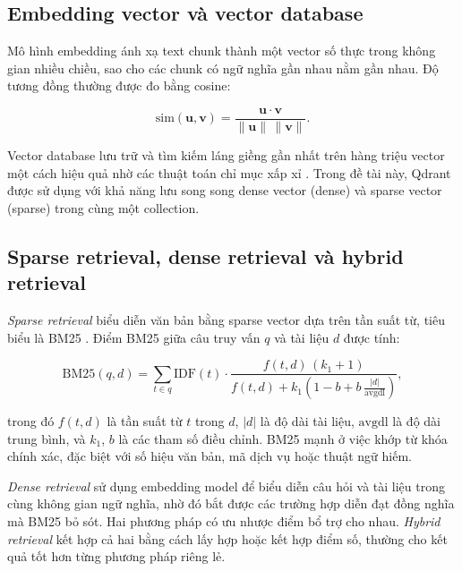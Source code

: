 \subsection{Embedding vector và vector database}

Mô hình embedding ánh xạ text chunk thành một vector số thực trong không gian
nhiều chiều, sao cho các chunk có ngữ nghĩa gần nhau nằm gần nhau. Độ tương đồng thường được
đo bằng cosine:

\begin{equation}
\mathrm{sim}(\mathbf{u}, \mathbf{v}) = \frac{\mathbf{u}\cdot\mathbf{v}}{\lVert\mathbf{u}\rVert\,\lVert\mathbf{v}\rVert}.
\end{equation}

Vector database lưu trữ và tìm kiếm láng giềng gần nhất trên hàng
triệu vector một cách hiệu quả nhờ các thuật toán chỉ mục xấp xỉ \cite{malkov2020hnsw}.
Trong đề tài này, Qdrant \cite{qdrant2024} được sử dụng với khả năng lưu song
song dense vector (dense) và sparse vector (sparse) trong cùng một collection.

\subsection{Sparse retrieval, dense retrieval và hybrid retrieval}

\emph{Sparse retrieval} biểu diễn văn bản bằng sparse vector dựa trên tần
suất từ, tiêu biểu là BM25 \cite{robertson2009bm25}. Điểm BM25 giữa câu truy vấn $q$ và
tài liệu $d$ được tính:

\begin{equation}
\mathrm{BM25}(q,d) = \sum_{t \in q} \mathrm{IDF}(t)\cdot
\frac{f(t,d)\,(k_1+1)}{f(t,d) + k_1\left(1-b+b\,\frac{|d|}{\mathrm{avgdl}}\right)},
\end{equation}

trong đó $f(t,d)$ là tần suất từ $t$ trong $d$, $|d|$ là độ dài tài liệu, $\mathrm{avgdl}$
là độ dài trung bình, và $k_1$, $b$ là các tham số điều chỉnh. BM25 mạnh ở việc khớp từ
khóa chính xác, đặc biệt với số hiệu văn bản, mã dịch vụ hoặc thuật ngữ hiếm.

\emph{Dense retrieval} \cite{karpukhin2020dpr} sử dụng embedding model để
biểu diễn câu hỏi và tài liệu trong cùng không gian ngữ nghĩa, nhờ đó bắt được các trường
hợp diễn đạt đồng nghĩa mà BM25 bỏ sót. Hai phương pháp có ưu nhược điểm bổ trợ cho nhau.
\emph{Hybrid retrieval} kết hợp cả hai bằng cách lấy hợp hoặc kết hợp điểm
số, thường cho kết quả tốt hơn từng phương pháp riêng lẻ.

